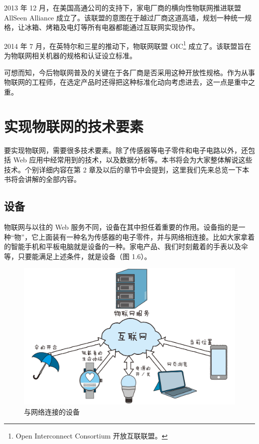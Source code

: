 \documentclass[12pt,UTF8]{ctexbook}
\begin{document}
2013 年 12 月，在美国高通公司的支持下，家电厂商的横向性物联网推进联盟 AllSeen Alliance 成立了。该联盟的意图在于越过厂商这道高墙，规划一种统一规格，让冰箱、烤箱及电灯等所有电器都能通过互联网实现协作。

2014 年 7 月，在英特尔和三星的推动下，物联网联盟 OIC\footnote{Open Interconnect Consortium
开放互联联盟。} 成立了。该联盟旨在为物联网相关机器的规格和认证设立标准。

可想而知，今后物联网普及的关键在于各厂商是否采用这种开放性规格。作为从事物联网的工程师，在选定产品时还得把这种标准化动向考虑进去，这一点是重中之重。

\section{实现物联网的技术要素}

要实现物联网，需要很多技术要素。除了传感器等电子零件和电子电路以外，还包括 Web 应用中经常用到的技术，以及数据分析等。本书将会为大家整体解说这些技术。个别详细内容在第 2 章及以后的章节中会提到，这里我们先来总览一下本书将会讲解的全部内容。

\subsection{设备}

物联网与以往的 Web 服务不同，设备在其中担任着重要的作用。设备指的是一种“物”，它上面装有一种名为传感器的电子零件，并与网络相连接。比如大家拿着的智能手机和平板电脑就是设备的一种。家电产品、我们时刻戴着的手表以及伞等，只要能满足上述条件，就是设备（图 1.6）。

\begin{figure}[htbp]
	\centering
	\includegraphics[width=1\linewidth]{6}
	\caption{与网络连接的设备}
	\label{fig:1}
\end{figure}
\end{document}
